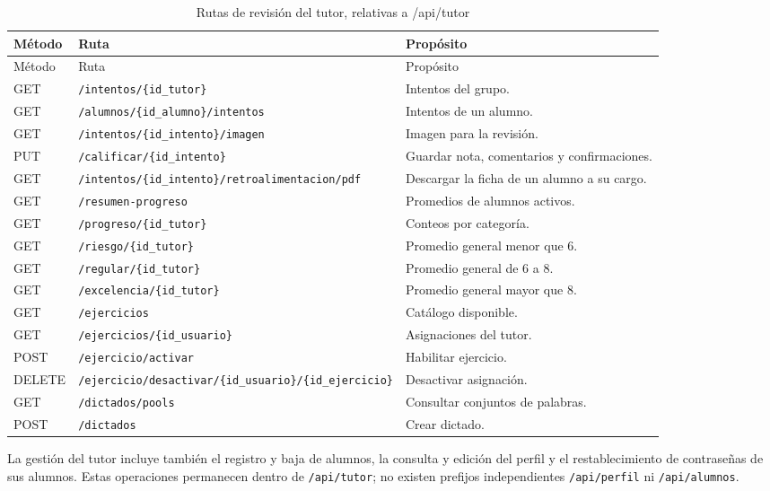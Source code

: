 \begin{longtable}{p{1.7cm}p{7.1cm}p{5.4cm}}
\caption{Rutas de revisión del tutor, relativas a /api/tutor}\label{tab:arquitectura_tutor_ejercicios}\\
\toprule Método & Ruta & Propósito \\ \midrule
\endfirsthead
\toprule Método & Ruta & Propósito \\ \midrule
\endhead
GET & \texttt{/intentos/\{id\_tutor\}} & Intentos del grupo. \\
GET & \texttt{/alumnos/\{id\_alumno\}/intentos} & Intentos de un alumno. \\
GET & \texttt{/intentos/\{id\_intento\}/imagen} & Imagen para la revisión. \\
PUT & \texttt{/calificar/\{id\_intento\}} & Guardar nota, comentarios y confirmaciones. \\
GET & \texttt{/intentos/\{id\_intento\}/}\newline\texttt{retroalimentacion/pdf} & Descargar la ficha de un alumno a su cargo. \\
GET & \texttt{/resumen-progreso} & Promedios de alumnos activos. \\
GET & \texttt{/progreso/\{id\_tutor\}} & Conteos por categoría. \\
GET & \texttt{/riesgo/\{id\_tutor\}} & Promedio general menor que 6. \\
GET & \texttt{/regular/\{id\_tutor\}} & Promedio general de 6 a 8. \\
GET & \texttt{/excelencia/\{id\_tutor\}} & Promedio general mayor que 8. \\
GET & \texttt{/ejercicios} & Catálogo disponible. \\
GET & \texttt{/ejercicios/\{id\_usuario\}} & Asignaciones del tutor. \\
POST & \texttt{/ejercicio/activar} & Habilitar ejercicio. \\
DELETE & \texttt{/ejercicio/desactivar/}\newline\texttt{\{id\_usuario\}/\{id\_ejercicio\}} & Desactivar asignación. \\
GET & \texttt{/dictados/pools} & Consultar conjuntos de palabras. \\
POST & \texttt{/dictados} & Crear dictado. \\
\bottomrule
\end{longtable}

La gestión del tutor incluye también el registro y baja de alumnos, la consulta y edición del perfil y el restablecimiento de contraseñas de sus alumnos. Estas operaciones permanecen dentro de \texttt{/api/tutor}; no existen prefijos independientes \texttt{/api/perfil} ni \texttt{/api/alumnos}.

